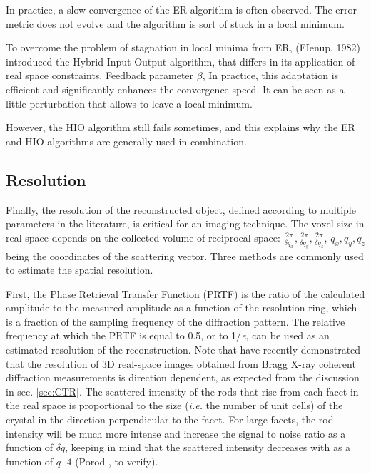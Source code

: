 In practice, a slow convergence of the ER algorithm is often observed. The error-metric does not evolve and the algorithm is sort of stuck in a local minimum.

To overcome the problem of stagnation in local minima from ER, (FIenup, 1982) introduced the Hybrid-Input-Output algorithm, that differs in its application of real space constraints. Feedback parameter $\beta$,
In practice, this adaptation is efficient and significantly enhances the convergence speed. It can be seen as a little perturbation that allows to leave a local minimum.

However, the HIO algorithm still fails sometimes, and this explains why the ER and HIO algorithms are generally used in combination.

\subsection{Resolution}

Finally, the resolution of the reconstructed object, defined according to multiple parameters in the literature, is critical for an imaging technique.
The voxel size in real space depends on the collected volume of reciprocal space: $\frac{2\pi}{\delta q_x}, \frac{2\pi}{\delta q_y}, \frac{2\pi}{\delta q_z}$, $q_x, q_y, q_z$ being the coordinates of the scattering vector.
Three methods are commonly used to estimate the spatial resolution.

First, the Phase Retrieval Transfer Function (PRTF) \parencite{chapman_high-resolution_2006} is the ratio of the calculated amplitude to the measured amplitude as a function of the resolution ring, which is a fraction of the sampling frequency of the diffraction pattern. The relative frequency at which the PRTF is equal to 0.5, or to 1/\textit{e}, can be used as an estimated resolution of the reconstruction.
Note that \cite{cherukara_anisotropic_2018} have recently demonstrated that the resolution of 3D real-space images obtained from Bragg X-ray coherent diffraction measurements is direction dependent, as expected from the discussion in sec. \ref{sec:CTR}.
The scattered intensity of the rods that rise from each facet in the real space is proportional to the size (\textit{i.e.} the number of unit cells) of the crystal in the direction perpendicular to the facet.
For large facets, the rod intensity will be much more intense and increase the signal to noise ratio as a function of $\delta q$, keeping in mind that the scattered intensity decreases with as a function of $q^-4$ (Porod \parencite{NielsenMcMorrow, Willmott}, to verify).

